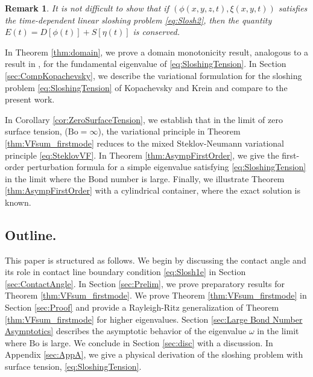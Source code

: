 \documentclass[letterpaper, 12pt]{amsart}
\newtheorem{remark}{Remark}
\newcommand{\bond}{\mathrm{Bo}}
\begin{document}
\begin{remark}It is not difficult to show that if $(\phi(x,y,z,t),\xi(x,y,t))$ satisfies the time-dependent linear sloshing problem \eqref{eq:Slosh2}, then the quantity $E(t) = D[\phi(t)] + S[\eta(t)]$ is conserved.  
\end{remark}

In Theorem \ref{thm:domain}, we prove a domain monotonicity result, analogous to a result in \cite{Moiseev:1964aa},  for the fundamental eigenvalue of \eqref{eq:SloshingTension}. In Section \ref{sec:CompKopachevsky}, we describe the variational formulation for the sloshing problem \eqref{eq:SloshingTension} of Kopachevsky and Krein \cite{Kopachevsky:2012aa} and compare to the present work. 

In Corollary \ref{cor:ZeroSurfaceTension}, we establish that in the limit of zero surface tension, ($\bond = \infty$), the variational principle in Theorem \ref{thm:VFsum_firstmode} reduces to the mixed Steklov-Neumann variational principle \eqref{eq:SteklovVF}.  In Theorem \ref{thm:AsympFirstOrder}, we give the first-order perturbation formula for a simple eigenvalue satisfying  \eqref{eq:SloshingTension} in the limit where the Bond number is large. Finally, we illustrate Theorem \ref{thm:AsympFirstOrder} with a cylindrical container, where the exact solution is known. 



\subsection{Outline.} This paper is structured as follows. We begin by discussing the contact angle and its role in contact line boundary condition \eqref{eq:Slosh1e} in Section \ref{sec:ContactAngle}. 
In Section \ref{sec:Prelim}, we prove preparatory results for  Theorem \ref{thm:VFsum_firstmode}. 
We  prove Theorem \ref{thm:VFsum_firstmode} in Section \ref{sec:Proof} and provide a Rayleigh-Ritz generalization of Theorem \ref{thm:VFsum_firstmode} for higher eigenvalues. Section \ref{sec:Large Bond Number Asymptotics} describes the asymptotic behavior of the eigenvalue $\omega$ in the limit where $\bond$ is large. We conclude in Section \ref{sec:disc} with a discussion. In Appendix \ref{sec:AppA}, we give a physical derivation of the sloshing problem with surface tension, \eqref{eq:SloshingTension}. 
\end{document}

